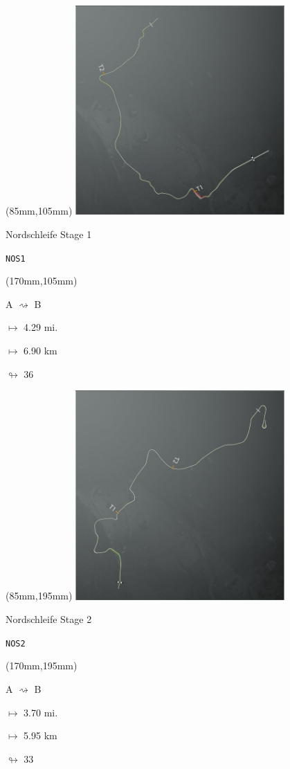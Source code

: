 \begin{textblock*}{80mm}(85mm,105mm)%
\includegraphics[width=80mm]{TR/2015-05-20_00038.png}
\centerline{Nordschleife Stage 1}
\par\hfill\tiny\tt NOS1\\
\end{textblock*}
\begin{textblock*}{30mm}(170mm,105mm)%
\par A $\rightsquigarrow$ B
\Large
\par$\mapsto$ 4.29 mi.
\par$\mapsto$ 6.90 km
\par$\looparrowright$ 36
\end{textblock*}
\begin{textblock*}{80mm}(85mm,195mm)%
\includegraphics[width=80mm]{TR/2015-05-20_00039.png}
\centerline{Nordschleife Stage 2}
\par\hfill\tiny\tt NOS2\\
\end{textblock*}
\begin{textblock*}{30mm}(170mm,195mm)%
\par A $\rightsquigarrow$ B
\Large
\par$\mapsto$ 3.70 mi.
\par$\mapsto$ 5.95 km
\par$\looparrowright$ 33
\end{textblock*}
\null\newpage

